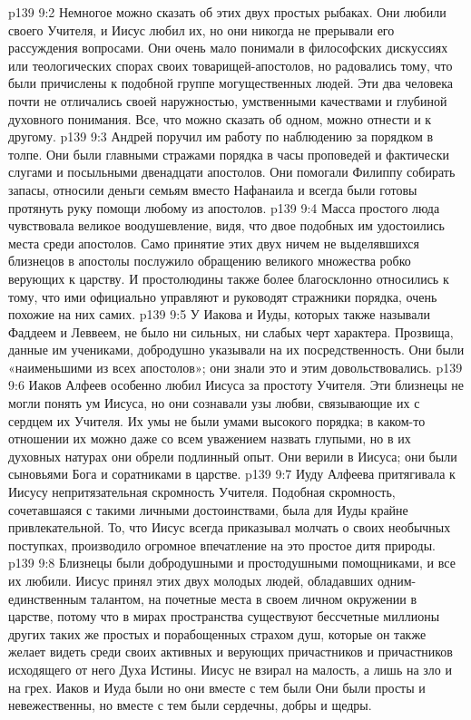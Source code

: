 \vs p139 9:2 \pc Немногое можно сказать об этих двух простых рыбаках. Они любили своего Учителя, и Иисус любил их, но они никогда не прерывали его рассуждения вопросами. Они очень мало понимали в философских дискуссиях или теологических спорах своих товарищей\hyp{}апостолов, но радовались тому, что были причислены к подобной группе могущественных людей. Эти два человека почти не отличались своей наружностью, умственными качествами и глубиной духовного понимания. Все, что можно сказать об одном, можно отнести и к другому.
\vs p139 9:3 Андрей поручил им работу по наблюдению за порядком в толпе. Они были главными стражами порядка в часы проповедей и фактически слугами и посыльными двенадцати апостолов. Они помогали Филиппу собирать запасы, относили деньги семьям вместо Нафанаила и всегда были готовы протянуть руку помощи любому из апостолов.
\vs p139 9:4 Масса простого люда чувствовала великое воодушевление, видя, что двое подобных им удостоились места среди апостолов. Само принятие этих двух ничем не выделявшихся близнецов в апостолы послужило обращению великого множества робко верующих к царству. И простолюдины также более благосклонно относились к тому, что ими официально управляют и руководят стражники порядка, очень похожие на них самих.
\vs p139 9:5 У Иакова и Иуды, которых также называли Фаддеем и Леввеем, не было ни сильных, ни слабых черт характера. Прозвища, данные им учениками, добродушно указывали на их посредственность. Они были «наименьшими из всех апостолов»; они знали это и этим довольствовались.
\vs p139 9:6 \pc Иаков Алфеев особенно любил Иисуса за простоту Учителя. Эти близнецы не могли понять ум Иисуса, но они сознавали узы любви, связывающие их с сердцем их Учителя. Их умы не были умами высокого порядка; в каком\hyp{}то отношении их можно даже со всем уважением назвать глупыми, но в их духовных натурах они обрели подлинный опыт. Они верили в Иисуса; они были сыновьями Бога и соратниками в царстве.
\vs p139 9:7 Иуду Алфеева притягивала к Иисусу непритязательная скромность Учителя. Подобная скромность, сочетавшаяся с такими личными достоинствами, была для Иуды крайне привлекательной. То, что Иисус всегда приказывал молчать о своих необычных поступках, производило огромное впечатление на это простое дитя природы.
\vs p139 9:8 \pc Близнецы были добродушными и простодушными помощниками, и все их любили. Иисус принял этих двух молодых людей, обладавших одним\hyp{}единственным талантом, на почетные места в своем личном окружении в царстве, потому что в мирах пространства существуют бессчетные миллионы других таких же простых и порабощенных страхом душ, которые он также желает видеть среди своих активных и верующих причастников и причастников исходящего от него Духа Истины. Иисус не взирал на малость, а лишь на зло и на грех. Иаков и Иуда были  но они вместе с тем были  Они были просты и невежественны, но вместе с тем были сердечны, добры и щедры.
